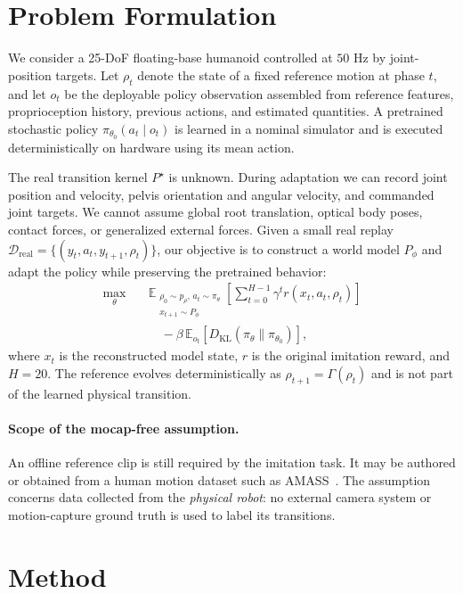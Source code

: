 \documentclass[10pt,twocolumn]{article}
\newcommand{\E}{\mathbb{E}}
\newcommand{\cD}{\mathcal{D}}
\begin{document}
\section{Problem Formulation}
\label{sec:problem}

We consider a 25-DoF floating-base humanoid controlled at $50$ Hz by joint-position targets. Let $\rho_t$ denote the state of a fixed reference motion at phase $t$, and let $o_t$ be the deployable policy observation assembled from reference features, proprioception history, previous actions, and estimated quantities. A pretrained stochastic policy $\pi_{\theta_0}(a_t\mid o_t)$ is learned in a nominal simulator and is executed deterministically on hardware using its mean action.

The real transition kernel $P^\star$ is unknown. During adaptation we can record joint position and velocity, pelvis orientation and angular velocity, and commanded joint targets. We cannot assume global root translation, optical body poses, contact forces, or generalized external forces. Given a small real replay $\cD_{\mathrm{real}}=\{(y_t,a_t,y_{t+1},\rho_t)\}$, our objective is to construct a world model $P_\phi$ and adapt the policy while preserving the pretrained behavior:
\begin{align}
\max_\theta\quad
&\E_{\substack{\rho_0\sim p_\rho,\,a_t\sim\pi_\theta\\x_{t+1}\sim P_\phi}}
\left[\sum_{t=0}^{H-1}\gamma^t r(x_t,a_t,\rho_t)\right]\nonumber\\
&\quad-\beta\,\E_{o_t}\!\left[D_{\mathrm{KL}}(\pi_\theta\|\pi_{\theta_0})\right],
\label{eq:objective}
\end{align}
where $x_t$ is the reconstructed model state, $r$ is the original imitation reward, and $H=20$. The reference evolves deterministically as $\rho_{t+1}=\Gamma(\rho_t)$ and is not part of the learned physical transition.

\paragraph{Scope of the mocap-free assumption.}
An offline reference clip is still required by the imitation task. It may be authored or obtained from a human motion dataset such as AMASS~\cite{mahmood2019amass}. The assumption concerns data collected from the \emph{physical robot}: no external camera system or motion-capture ground truth is used to label its transitions.

\section{Method}
\label{sec:method}
\end{document}
